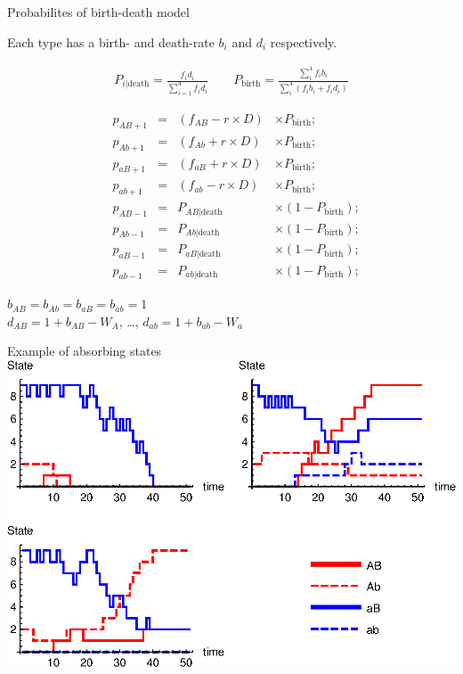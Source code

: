 \documentclass{beamer}
\begin{document}
\begin{frame}{Probabilites of birth-death model}

Each type has a birth- and death-rate $b_i$ and $d_i$ respectively. 

    \begin{equation*}
    \begin{aligned}
        P_{i|\text{death}}=\frac{f_id_i}{\sum_{i=1}^4 f_id_i} \qquad P_\text{birth} = \frac{\sum_i^4 f_i b_i}{\sum_i^4 (f_i b_i + f_i d_i)} 
    \end{aligned}
    \end{equation*}
    
    \begin{equation*}
    \begin{aligned}
        &p_{AB+1} & =& (f_{AB}-r\times D) & \times P_\text{birth};\\
        &p_{Ab+1} & =& (f_{Ab}+r\times D) & \times P_\text{birth};\\
        &p_{aB+1} & =& (f_{aB}+r\times D) & \times P_\text{birth};\\
        &p_{ab+1} & =& (f_{ab}-r\times D) & \times P_\text{birth};\\
        &p_{AB-1} & =& P_{AB|\text{death}} & \times (1-P_\text{birth}); \\
        &p_{Ab-1} & =& P_{Ab|\text{death}} & \times (1-P_\text{birth}); \\
        &p_{aB-1} & =& P_{aB|\text{death}} & \times (1-P_\text{birth}); \\
        &p_{ab-1} & =& P_{ab|\text{death}} & \times (1-P_\text{birth}); 
    \end{aligned}
    \end{equation*} 

    
\normalsize

$b_{AB}=b_{Ab}=b_{aB}=b_{ab} =1$ \\
$d_{AB} = 1+b_{AB}-W_A$, \dots,  $d_{ab} = 1+b_{ab}-W_a$
 
\end{frame}

\begin{frame}{Example of absorbing states}
    \includegraphics[width=1.0\textwidth]{Matlab/Figures/gridplot.eps}
\end{frame}
\end{document}
